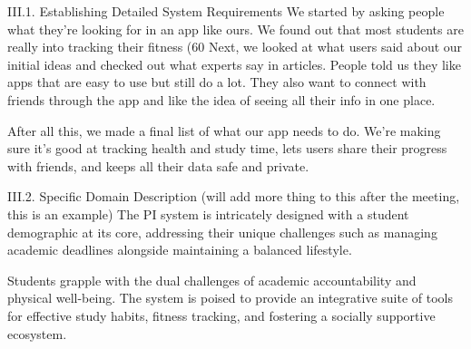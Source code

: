 \documentclass[12pt]{article}
\begin{document}
III.1. Establishing Detailed System Requirements
We started by asking people what they're looking for in an app like ours. We found out that most students are really into tracking their fitness (60%
Next, we looked at what users said about our initial ideas and checked out what experts say in articles. People told us they like apps that are easy to use but still do a lot. They also want to connect with friends through the app and like the idea of seeing all their info in one place.\par
After all this, we made a final list of what our app needs to do. We're making sure it's good at tracking health and study time, lets users share their progress with friends, and keeps all their data safe and private.\par
 
III.2. Specific Domain Description (will add more thing to this after the meeting, this is an example)
The PI system is intricately designed with a student demographic at its core, addressing their unique challenges such as managing academic deadlines alongside maintaining a balanced lifestyle.\par
Students grapple with the dual challenges of academic accountability and physical well-being. The system is poised to provide an integrative suite of tools for effective study habits, fitness tracking, and fostering a socially supportive ecosystem.\par
 
\end{document}
